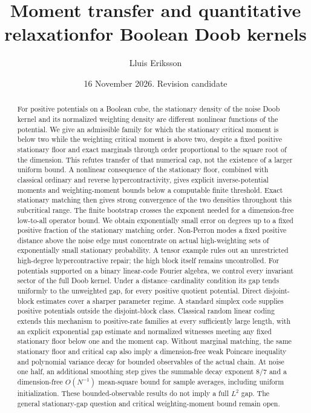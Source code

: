 \documentclass[11pt]{article}
\title{Moment transfer and quantitative relaxation\newline for Boolean Doob kernels}
\author{Lluis Eriksson}
\date{16 November 2026. Revision candidate}
\begin{document}
\maketitle
\begin{abstract}
For positive potentials on a Boolean cube, the stationary density of the noise Doob kernel and its normalized weighting density are different nonlinear functions of the potential. We give an admissible family for which the stationary critical moment is below two while the weighting critical moment is above two, despite a fixed positive stationary floor and exact marginals through order proportional to the square root of the dimension. This refutes transfer of that numerical cap, not the existence of a larger uniform bound. A nonlinear consequence of the stationary floor, combined with classical ordinary and reverse hypercontractivity, gives explicit inverse-potential moments and weighting-moment bounds below a computable finite threshold. Exact stationary matching then gives strong convergence of the two densities throughout this subcritical range. The finite bootstrap crosses the exponent needed for a dimension-free low-to-all operator bound. We obtain exponentially small error on degrees up to a fixed positive fraction of the stationary matching order. Non-Perron modes a fixed positive distance above the noise edge must concentrate on actual high-weighting sets of exponentially small stationary probability. A tensor example rules out an unrestricted high-degree hypercontractive repair; the high block itself remains uncontrolled. For potentials supported on a binary linear-code Fourier algebra, we control every invariant sector of the full Doob kernel. Under a distance--cardinality condition its gap tends uniformly to the unweighted gap, for every positive quotient potential. Direct disjoint-block estimates cover a sharper parameter regime. A standard simplex code supplies positive potentials outside the disjoint-block class. Classical random linear coding extends this mechanism to positive-rate families at every sufficiently large length, with an explicit exponential gap estimate and normalized witnesses meeting any fixed stationary floor below one and the moment cap. Without marginal matching, the same stationary floor and critical cap also imply a dimension-free weak Poincare inequality and polynomial variance decay for bounded observables of the actual chain. At noise one half, an additional smoothing step gives the summable decay exponent $8/7$ and a dimension-free $O(N^{-1})$ mean-square bound for sample averages, including uniform initialization. These bounded-observable results do not imply a full $L^2$ gap. The general stationary-gap question and critical weighting-moment bound remain open.
\end{abstract}
\end{document}
